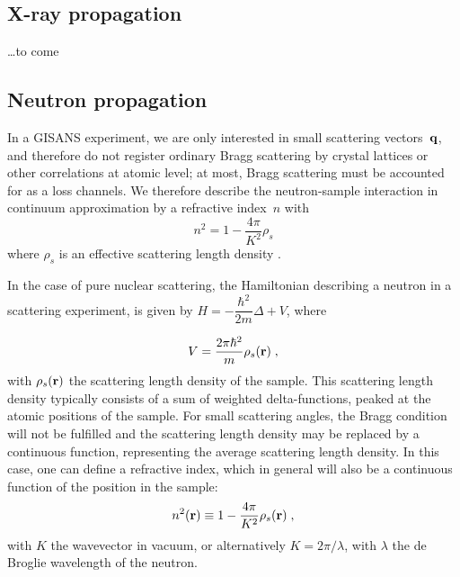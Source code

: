 \subsection{X-ray propagation}

\ldots to come

\subsection{Neutron propagation}

In a GISANS experiment,
we are only interested in small scattering vectors~$\mathbf{q}$,
and therefore do not register ordinary Bragg scattering
by crystal lattices or other correlations at atomic level;
at most, Bragg scattering must be accounted for as a loss channels.
We therefore describe the neutron-sample interaction
in continuum approximation by a refractive index~$n$ with
\begin{equation}
  n^2=1-\frac{4\pi}{K^2}\rho_s
\end{equation}
where $\rho_s$ is an effective scattering length density
\cite{Lax51,Sea89}.

In the case of pure nuclear scattering, the Hamiltonian describing a neutron in a scattering experiment, is given by $H = -\dfrac{\hbar^2}{2m}\Delta + V$, where

\begin{equation*}
  V = \frac{2\pi \hbar^2}{m}\rho_s(\mathbf{r}) \; ,
\end{equation*}
with $\rho_s(\mathbf{r})$ the scattering length density of the sample. This scattering length density typically consists of a sum of weighted delta-functions, peaked at the atomic positions of the sample. For small scattering angles, the Bragg condition will not be fulfilled and the scattering length density may be replaced by a continuous function, representing the average scattering length density. In this case, one can define a refractive index, which in general will also be a continuous function of the position in the sample:
\begin{equation*}
  n^2(\mathbf{r}) \equiv 1 - \frac{4\pi}{K^2}\rho_s(\mathbf{r}) \; ,
\end{equation*}
with $K$ the wavevector in vacuum, or alternatively $K = 2\pi /\lambda$, with $\lambda$ the de Broglie wavelength of the neutron.


